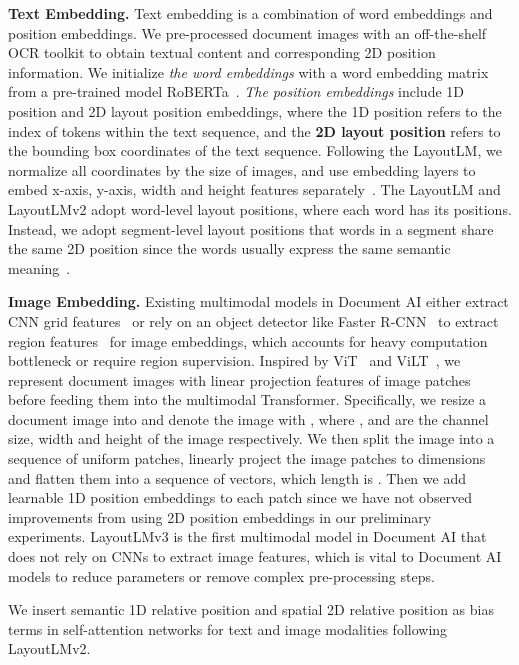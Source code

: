 \documentclass[sigconf]{acmart}
\begin{document}
\noindent \textbf{Text Embedding.}
Text embedding is a combination of word embeddings and position embeddings.
We pre-processed document images with an off-the-shelf OCR toolkit to obtain textual content and corresponding 2D position information.
We initialize \textit{the word embeddings} with a word embedding matrix from a pre-trained model RoBERTa~\cite{liu2019roberta}.
\textit{The position embeddings} include 1D position and 2D layout position embeddings, where the 1D position refers to the index of tokens within the text sequence, and the \textbf{2D layout position} refers to the bounding box coordinates of the text sequence.
Following the LayoutLM, we normalize all coordinates by the size of images, and use embedding layers to embed x-axis, y-axis, width and height features separately~\cite{xu2020layoutlm}.
The LayoutLM and LayoutLMv2 adopt word-level layout positions, where each word has its positions.
Instead, we adopt segment-level layout positions that words in a segment share the same 2D position since the words usually express the same semantic meaning~\cite{Li2021StructuralLMSP}.

\noindent \textbf{Image Embedding.}
Existing multimodal models in Document AI either extract CNN grid features~\cite{xu-etal-2021-layoutlmv2,Appalaraju_2021_ICCV} or rely on an object detector like Faster R-CNN~\cite{Ren2015FasterRT} to extract region features~\cite{xu2020layoutlm,Powalski2021GoingFB,li2021selfdoc,gu2021unidoc} for image embeddings, which accounts for heavy computation bottleneck or require region supervision.
Inspired by ViT~\cite{dosovitskiy2020vit} and ViLT~\cite{kim2021vilt}, we represent document images with linear projection features of image patches before feeding them into the multimodal Transformer.
Specifically, we resize a document image into  and denote the image with , where ,  and  are the channel size, width and height of the image respectively.
We then split the image into a sequence of uniform  patches, linearly project the image patches to  dimensions and flatten them into a sequence of vectors, which length is .
Then we add learnable 1D position embeddings to each patch since we have not observed improvements from using 2D position embeddings in our preliminary experiments.
LayoutLMv3 is the first multimodal model in Document AI that does not rely on CNNs to extract image features, which is vital to Document AI models to reduce parameters or remove complex pre-processing steps.

We insert semantic 1D relative position and spatial 2D relative position as bias terms in self-attention networks for text and image modalities following LayoutLMv2\cite{xu-etal-2021-layoutlmv2}.
\end{document}
